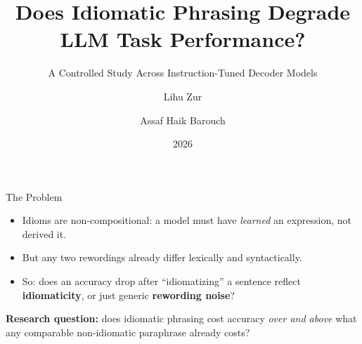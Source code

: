 \documentclass[10pt]{beamer}
\title[Idiomatic Phrasing \& LLM Accuracy]{Does Idiomatic Phrasing Degrade LLM Task Performance?}
\subtitle{A Controlled Study Across Instruction-Tuned Decoder Models}
\author{Lihu Zur \and Assaf Haik Barouch}
\institute{NLP Course, Reichman University}
\date{2026}
\begin{document}
\begin{frame}
  \titlepage
\end{frame}

\begin{frame}{The Problem}
  \begin{itemize}
    \item Idioms are non-compositional: a model must have \emph{learned}
      an expression, not derived it.
    \item But any two rewordings already differ lexically and syntactically.
    \item So: does an accuracy drop after ``idiomatizing'' a sentence reflect
      \textbf{idiomaticity}, or just generic \textbf{rewording noise}?
  \end{itemize}
  \vspace{1em}
  \textbf{Research question:} does idiomatic phrasing cost accuracy
  \emph{over and above} what any comparable non-idiomatic paraphrase already costs?
\end{frame}
\end{document}

